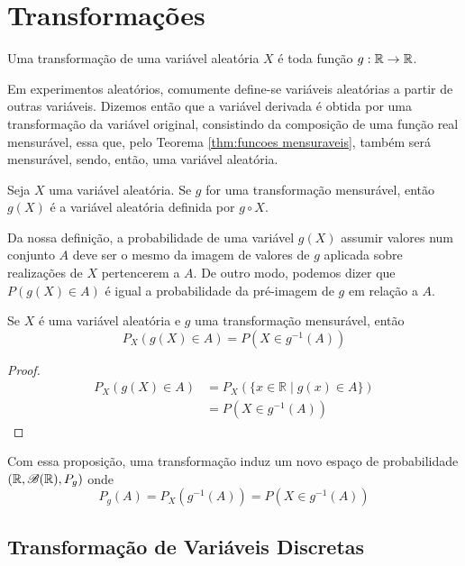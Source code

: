 \section{Transformações}


\begin{def:transformacao}
Uma transformação de uma variável aleatória $X$ é toda função $g: \mathbb{R} \to \mathbb{R}$.
\end{def:transformacao}

Em experimentos aleatórios, comumente define-se variáveis aleatórias a partir
de outras variáveis.
Dizemos então que a variável derivada é obtida por uma transformação da variável
original, consistindo da composição de uma função real mensurável, essa que, pelo
Teorema \ref{thm:funcoes mensuraveis}, também será mensurável, sendo, então,
uma variável aleatória.

\begin{def:variavel derivada}
Seja $X$ uma variável aleatória.
Se $g$ for uma transformação mensurável, então $g(X)$ é a variável aleatória definida
por $g \circ X$.
\end{def:variavel derivada}

Da nossa definição, a probabilidade de uma variável $g(X)$ assumir valores num conjunto $A$
deve ser o mesmo da imagem de valores de $g$ aplicada sobre realizações de $X$ pertencerem
a $A$.
De outro modo, podemos dizer que $P(g(X) \in A)$ é igual a probabilidade da pré-imagem
de $g$ em relação a $A$.

\begin{prop:prob transformacao}
\label{prop:prob transformacao}
Se $X$ é uma variável aleatória e $g$ uma transformação mensurável, então
\[
	P_X(g(X) \in A) = P(X \in g^{-1}(A))
\]
\begin{proof}
	\begin{align*}
		P_X(g(X) \in A) & = P_X(\{x \in \mathbb{R} \mid g(x) \in A\}) \\
		                & = P(X \in g^{-1}(A))
	\end{align*}
\end{proof}
\end{prop:prob transformacao}

Com essa proposição, uma transformação induz um novo espaço de probabilidade
$(\mathbb{R}, \mathcal{B}(\mathbb{R}), P_g)$ onde
\[
	P_g(A) = P_X(g^{-1}(A)) = P(X \in g^{-1}(A))
\]

\subsection{Transformação de Variáveis Discretas}

